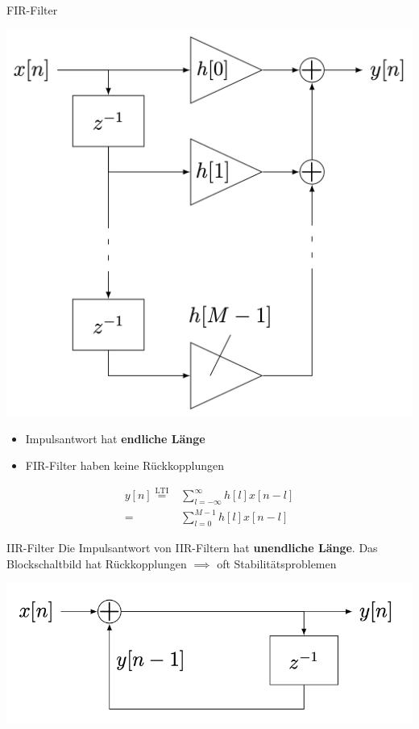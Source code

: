 \documentclass[14pt, aspectratio=169, handout]{beamer}
\begin{document}
\begin{frame}{FIR-Filter}
\begin{multicols}{2}
    \includegraphics[width=\linewidth]{figures/FIR.png}

    \vfill \null
    \columnbreak

    \begin{itemize}
        \item Impulsantwort hat \textbf{endliche Länge}
        \item FIR-Filter haben keine Rückkopplungen
    \end{itemize}
    \vspace*{-0.5cm}
    \begin{align*}
        y[n] \overset{\text{LTI}}{=} &\sum_{l=-\infty}^\infty h[l] x[n-l] \\
        = &\sum_{l=0}^{M-1} h[l]x[n-l] 
    \end{align*}
\end{multicols}
\end{frame}

\begin{frame}{IIR-Filter}
    Die Impulsantwort von IIR-Filtern hat \textbf{unendliche Länge}. Das Blockschaltbild hat Rückkopplungen $\implies$ oft Stabilitätsproblemen\\
    \begin{center}
        \includegraphics[width=0.8\linewidth]{figures/IIR.png}
    \end{center}
\end{frame}
\end{document}
